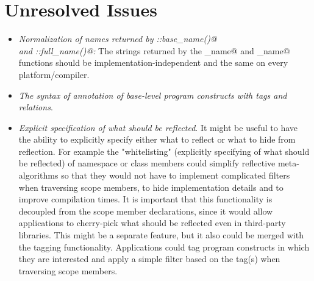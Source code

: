 \section{Unresolved Issues}

\begin{itemize}
	\item {\em Normalization of names returned by \verb@Named::base_name()@\\and \verb@Named::full_name()@:}
	The strings returned by the \verb@base_name@ and \verb@full_name@ functions should be
	implementation-independent and the same on every platform/compiler.

	\item {\em The syntax of annotation of base-level program constructs with tags and relations}.

	\item {\em Explicit specification of what should be reflected}. It might be useful to have
	the ability to explicitly specify either what to reflect or what to hide from reflection.
	For example the "whitelisting" (explicitly specifying of what should be reflected) of namespace
	or class members could simplify reflective meta-algorithms so that they would not have
	to implement complicated filters when traversing scope members, to hide implementation details and
	to improve compilation times. It is important that this functionality is decoupled from the
	scope member declarations, since it would allow applications to cherry-pick what should be
	reflected even in third-party libraries.
	This might be a separate feature, but it also could be merged with the tagging functionality.
	Applications could tag program constructs in which they are interested and apply a simple
	filter based on the tag(s) when traversing scope members.
\end{itemize}
